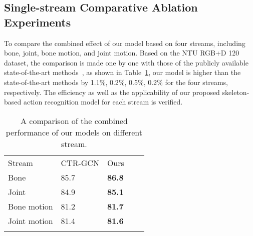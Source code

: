 \documentclass[letterpaper]{article} \usepackage[submission]{aaai23}  \usepackage{times}  \usepackage{helvet}  \usepackage{courier}  \usepackage[hyphens]{url}  \usepackage{graphicx} \urlstyle{rm} \def\UrlFont{\rm}  \usepackage{natbib}  \usepackage{caption} \frenchspacing  \setlength{\pdfpagewidth}{8.5in} \setlength{\pdfpageheight}{11in} \usepackage{algorithm}
\begin{document}
\subsection{Single-stream Comparative Ablation Experiments}
To compare the combined effect of our model based on four streams, including bone, joint, bone motion, and joint motion. Based on the NTU RGB+D 120 dataset, the comparison is made one by one with those of the publicly available state-of-the-art methods~\cite{2021Channel}, as shown in Table~\ref{tab:13}, our model is higher than the state-of-the-art methods by 1.1$\%$, 0.2$\%$, 0.5$\%$, 0.2$\%$ for the four streams, respectively. The efficiency as well as the applicability of our proposed skeleton-based action recognition model for each stream is verified.


\begin{table}[htp]
 \centering


\begin{tabular}{lllll}
\hline\noalign{\smallskip}
Stream & CTR-GCN &Ours\\
\noalign{\smallskip}\hline\noalign{\smallskip}
Bone&85.7&{\bf86.8}\\
Joint& 84.9&{\bf 85.1}\\
Bone motion& 81.2&{\bf 81.7}\\
Joint motion&81.4&{\bf81.6}\\

\noalign{\smallskip}\hline
\end{tabular}
\caption{A comparison of the combined performance of our models on different stream.}
\label{tab:13}
\end{table}
\end{document}
